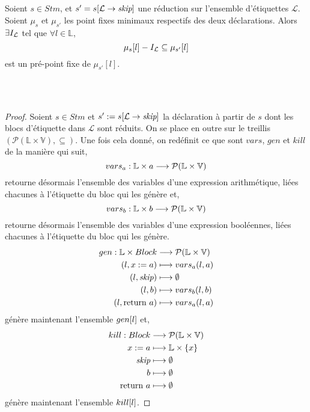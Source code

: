 \documentclass[a4paper, 10pt]{article}
\begin{document}
\\
\\
\begin{theorem}
	Soient $s \in Stm$, et $s' = s[\mathcal{L} \rightarrow{ \textit{skip} }]$ une réduction sur
	l'ensemble d'étiquettes $\mathcal{L}$. Soient $\mu_s$ et $\mu_{s'}$ les point fixes minimaux respectifs
	des deux déclarations.
	Alors $\exists I_{\mathcal{L}}$ tel que $\forall l \in \mathbb{L}$,
	\[
		\mu_s[l] - I_{\mathcal{L}} \subseteq \mu_{s'}[l]
	\]
	est un pré-point fixe de $\mu_{s'}[l]$.
\end{theorem}
\\
\\
\begin{proof}
	Soient $s \in Stm$ et $s' := s[\mathcal{L} \rightarrow{ \textit{skip} }]$ la déclaration à partir de $s$ dont les blocs d'étiquette 
	dans $\mathcal{L}$ sont réduits. 
	On se place en outre sur le treillis $(\mathcal{P}(\mathbb{L} \times \mathbb{V}), \subseteq)$. 
	Une fois cela donné, on redéfinit ce que sont $vars$, $gen$ et $kill$ de la manière qui suit, 
	\[vars_a : \mathbb{L} \times a \longrightarrow \mathcal{P}(\mathbb{L} \times \mathbb{V})\]
	retourne désormais l'ensemble des variables d'une expression arithmétique, liées chacunes à l'étiquette du bloc qui les génère et,
	\[vars_b : \mathbb{L} \times b \longrightarrow \mathcal{P}(\mathbb{L} \times \mathbb{V})\]
	retourne désormais l'ensemble des variables d'une expression booléennes, liées chacunes à l'étiquette du bloc qui les génère.
	\begin{align*}
		gen : \mathbb{L} \times Block &\longrightarrow \mathcal{P}(\mathbb{L} \times \mathbb{V})\\
		(l, {x}\space:=\space{a}) &\longmapsto vars_a(l, a)\\
		(l, \textit{skip}) &\longmapsto \emptyset\\
		(l, b) &\longmapsto vars_b(l, b)\\
		(l, \text{return }{a}) &\longmapsto vars_a(l, a)
	\end{align*}
	génère maintenant l'ensemble $gen[l]$ et,
	\begin{align*}
		kill : Block &\longrightarrow \mathcal{P}(\mathbb{L} \times \mathbb{V})\\
		{x}\space:=\space{a} &\longmapsto \mathbb{L} \times \{x\}\\
		\textit{skip} &\longmapsto \emptyset\\
		b &\longmapsto \emptyset\\
		\text{return }{a} &\longmapsto \emptyset
	\end{align*}
	génère maintenant l'ensemble $kill[l]$.

\end{proof}
\end{document}
